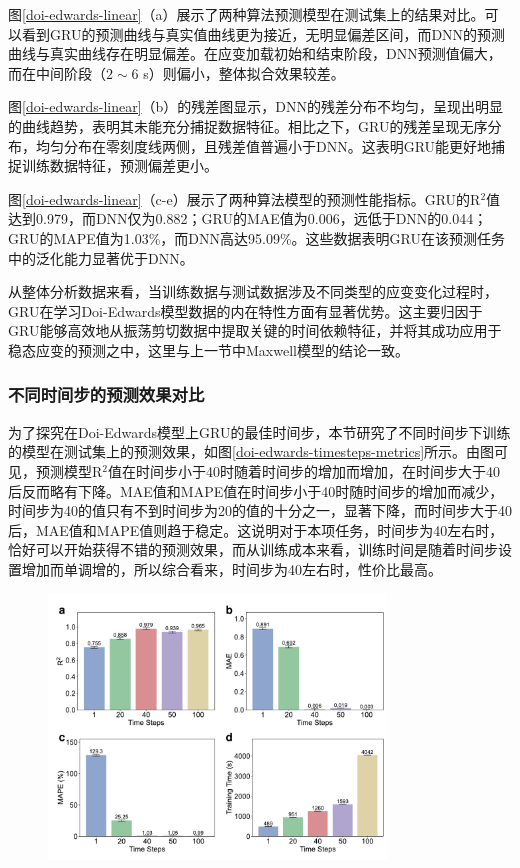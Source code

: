 图\ref{doi-edwards-linear}（a）展示了两种算法预测模型在测试集上的结果对比。可以看到GRU的预测曲线与真实值曲线更为接近，无明显偏差区间，而DNN的预测曲线与真实曲线存在明显偏差。在应变加载初始和结束阶段，DNN预测值偏大，而在中间阶段（$2\sim6$ s）则偏小，整体拟合效果较差。

图\ref{doi-edwards-linear}（b）的残差图显示，DNN的残差分布不均匀，呈现出明显的曲线趋势，表明其未能充分捕捉数据特征。相比之下，GRU的残差呈现无序分布，均匀分布在零刻度线两侧，且残差值普遍小于DNN。这表明GRU能更好地捕捉训练数据特征，预测偏差更小。

图\ref{doi-edwards-linear}（c-e）展示了两种算法模型的预测性能指标。GRU的R$^2$值达到0.979，而DNN仅为0.882；GRU的MAE值为0.006，远低于DNN的0.044；GRU的MAPE值为1.03\%，而DNN高达95.09\%。这些数据表明GRU在该预测任务中的泛化能力显著优于DNN。

从整体分析数据来看，当训练数据与测试数据涉及不同类型的应变变化过程时，GRU在学习Doi-Edwards模型数据的内在特性方面有显著优势。这主要归因于GRU能够高效地从振荡剪切数据中提取关键的时间依赖特征，并将其成功应用于稳态应变的预测之中，这里与上一节中Maxwell模型的结论一致。

\subsubsection{不同时间步的预测效果对比}

为了探究在Doi-Edwards模型上GRU的最佳时间步，本节研究了不同时间步下训练的模型在测试集上的预测效果，如图\ref{doi-edwards-timesteps-metrics}所示。由图可见，预测模型R$^2$值在时间步小于40时随着时间步的增加而增加，在时间步大于40后反而略有下降。MAE值和MAPE值在时间步小于40时随时间步的增加而减少，时间步为40的值只有不到时间步为20的值的十分之一，显著下降，而时间步大于40后，MAE值和MAPE值则趋于稳定。这说明对于本项任务，时间步为40左右时，恰好可以开始获得不错的预测效果，而从训练成本来看，训练时间是随着时间步设置增加而单调增的，所以综合看来，时间步为40左右时，性价比最高。
\begin{figure}[htbp]
  \centering
  \includegraphics[width=0.8\textwidth]{Fig/doi-edwards-timesteps-metrics.pdf}
\end{figure}


